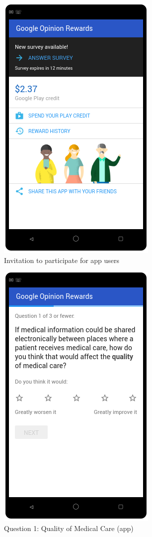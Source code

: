 \begin{figure}
	\includegraphics{Selection_360.png}
	\caption{\label{fig:app:intro}Invitation to participate for app users}
\end{figure}
\begin{figure}
	\includegraphics{Selection_361.png}
	\caption{\label{fig:app:q1}Question 1: Quality of Medical Care (app)}
\end{figure}

